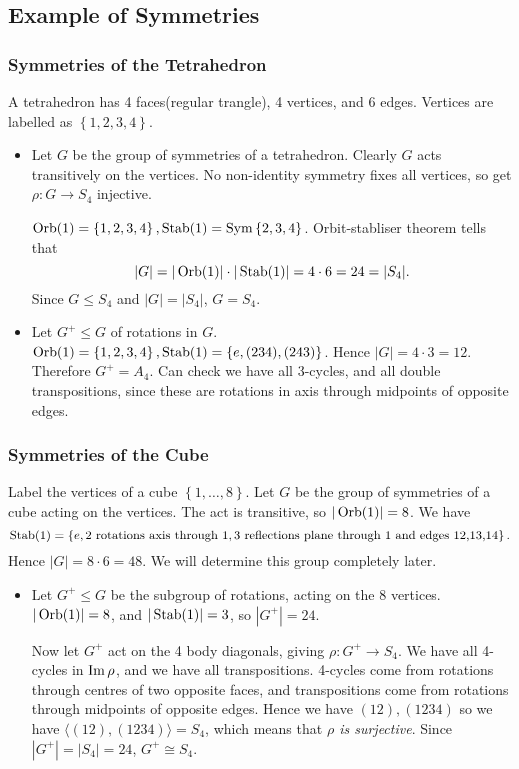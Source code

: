 \documentclass[a4paper]{article}
\begin{document}
    \subsection{Example of Symmetries}
    \subsubsection{Symmetries of the Tetrahedron}
    A tetrahedron has 4 faces(regular trangle), 4 vertices, and 6 edges. Vertices are labelled as $ \left\{ 1,2,3,4 \right\} $.

    \begin{itemize}
        \item Let $G$ be the group of symmetries of a tetrahedron. Clearly $G$ acts transitively on the vertices. No non-identity symmetry fixes all vertices, so get $ \rho:G \to S_4 $ injective.

        $ \operatorname{Orb}(1)=\left\{ 1,2,3,4 \right\}, \operatorname{Stab}(1)=\operatorname{Sym}\left\{ 2,3,4 \right\} $. Orbit-stabliser theorem tells that 
        \[
            |G|=|\operatorname{Orb}(1)|\cdot |\operatorname{Stab}(1)| = 4\cdot 6 = 24 = |S_4|
        .\]
        Since $ G \le S_4 $ and $ |G|=|S_4| $, $ G=S_4 $.
        \item Let $ G^+\le G $ of rotations in $G$. $ \operatorname{Orb}(1)=\left\{ 1,2,3,4 \right\}, \operatorname{Stab}(1)=\left\{ e, (234),(243) \right\} $. Hence $ |G|=4\cdot 3 = 12 $. Therefore $ G^+=A_4 $. Can check we have all 3-cycles, and all double transpositions, since these are rotations in axis through midpoints of opposite edges.
    \end{itemize}
    \subsubsection{Symmetries of the Cube}
    Label the vertices of a cube $ \left\{ 1,\dots,8 \right\} $. Let $G$ be the group of symmetries of a cube acting on the vertices. The act is transitive, so $ |\operatorname{Orb}(1)|=8 $. We have 
    \[
        \operatorname{Stab}(1)=\left\{ e,\text{2 rotations axis through 1}, \text{3 reflections plane through 1 and edges 12,13,14} \right\}
    .\]
    Hence $ |G|=8\cdot 6=48. $ We will determine this group completely later.
    \begin{itemize}
        \item Let $ G^+ \le G$ be the subgroup of rotations, acting on the 8 vertices. $ |\operatorname{Orb}(1)|=8 $, and $ |\operatorname{Stab}(1)|=3 $, so $ |G^+|=24 $.

        Now let $ G^+ $ act on the 4 body diagonals, giving $ \rho:G^+\to S_4 $. We have all 4-cycles in $ \operatorname{Im} \rho $, and we have all transpositions. 4-cycles come from rotations through centres of two opposite faces, and transpositions come from rotations through midpoints of opposite edges. Hence we have $ (12),(1234) $ so we have $ \langle (12),(1234) \rangle =S_4 $, which means that \textit{$ \rho $ is surjective}. Since $ |G^+|=|S_4|=24 $, $ G^+\cong S_4 $.
    \end{itemize}
\end{document}
